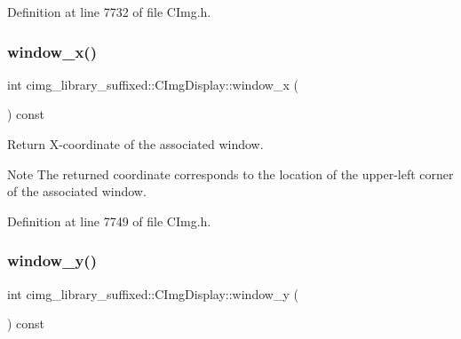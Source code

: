 Definition at line 7732 of file C\+Img.\+h.

\mbox{\label{structcimg__library__suffixed_1_1CImgDisplay_a1c32a0da1d7892afd9e614a5ae79692a}} 
\subsubsection{\texorpdfstring{window\+\_\+x()}{window\_x()}}
{\footnotesize\ttfamily int cimg\+\_\+library\+\_\+suffixed\+::\+C\+Img\+Display\+::window\+\_\+x (\begin{DoxyParamCaption}{ }\end{DoxyParamCaption}) const\hspace{0.3cm}{\ttfamily [inline]}}



Return X-\/coordinate of the associated window. 

\begin{DoxyNote}{Note}
The returned coordinate corresponds to the location of the upper-\/left corner of the associated window. 
\end{DoxyNote}


Definition at line 7749 of file C\+Img.\+h.

\mbox{\label{structcimg__library__suffixed_1_1CImgDisplay_ada7f40024566383be680697e9731fde8}} 
\subsubsection{\texorpdfstring{window\+\_\+y()}{window\_y()}}
{\footnotesize\ttfamily int cimg\+\_\+library\+\_\+suffixed\+::\+C\+Img\+Display\+::window\+\_\+y (\begin{DoxyParamCaption}{ }\end{DoxyParamCaption}) const\hspace{0.3cm}{\ttfamily [inline]}}



